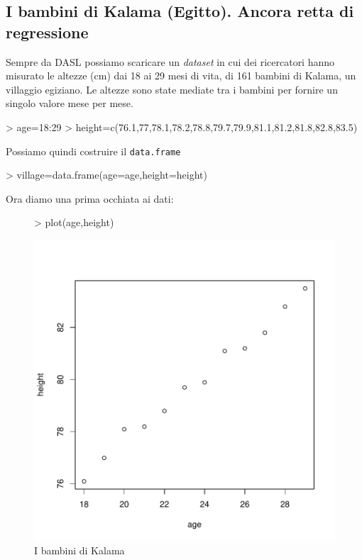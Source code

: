 \documentclass[onecolumn,12pt]{book}
\begin{document}
\subsection{I bambini di Kalama (Egitto). Ancora retta di regressione}
Sempre da DASL \cite{DASL} possiamo scaricare un \emph{dataset} in cui dei ricercatori hanno misurato le altezze (cm) dai 18 ai 29 mesi di vita, di 161 bambini di Kalama, un villaggio egiziano. Le altezze sono state mediate tra i bambini per fornire un singolo valore mese per mese.
\begin{Schunk}
\begin{Sinput}
> age=18:29
> height=c(76.1,77,78.1,78.2,78.8,79.7,79.9,81.1,81.2,81.8,82.8,83.5)
\end{Sinput}
\end{Schunk}
Possiamo quindi costruire il \texttt{data.frame}
\begin{Schunk}
\begin{Sinput}
> village=data.frame(age=age,height=height)
\end{Sinput}
\end{Schunk}
Ora diamo una prima occhiata ai dati:
\begin{figure}[htbp]
\begin{center}
\begin{Schunk}
\begin{Sinput}
> plot(age,height)
\end{Sinput}
\end{Schunk}
\includegraphics{RbookParte2-053}
\caption{I bambini di Kalama}
\label{kalama}
\end{center}
\end{figure}
\end{document}
